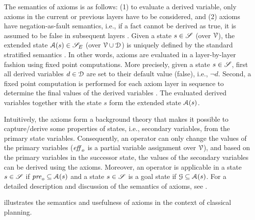 The semantics of axioms is as follows: (1) to evaluate a derived variable, only axioms in the current or previous layers have to be considered, and (2) axioms have negation-as-fault semantics, i.e., if a fact cannot be derived as true, it is assumed to be false in subsequent layers \autocite{speck-et-al-icaps2019}.
Given a state $s \in \mathscr S$ (over $\mathcal V$), the extended state $\mathcal A(s) \in \mathscr S_{E}$ (over $\mathcal V \cup \mathcal D$) is uniquely defined by the standard stratified semantics \autocite{apt-et-al-1988,thiebaux-et-al-aij2005}.
%
In other words, axioms are evaluated in a layer-by-layer fashion using fixed point computations.
More precisely, given a state $s \in \mathscr S$, first all derived variables $d \in \mathcal D$ are set to their default value (false), i.e., $\lnot d$. 
Second, a fixed point computation is performed for each axiom layer in sequence to determine the final values of the derived variables \autocite{helmert-2008}.
The evaluated derived variables together with the state $s$ form the extended state $\mathcal A(s)$.

Intuitively, the axioms form a background theory that makes it possible to capture/derive some properties of states, i.e., secondary variables, from the primary state variables.
Consequently, an operator can only change the values of the primary variables ($\mathit{eff}_o$ is a partial variable assignment over $\mathcal V$), and based on the primary variables in the successor state, the values of the secondary variables can be derived using the axioms.
Moreover, an operator is applicable in a state $s \in \mathscr S$ if $\mathit{pre}_o \subseteq \mathcal A(s)$ and a state $s \in \mathscr S$ is a goal state if $\mathcal G \subseteq \mathcal A(s)$.
For a detailed description and discussion of the semantics of axioms, see \textcite{thiebaux-et-al-aij2005,helmert-2008,helmert-jair2006}.


 illustrates the semantics and usefulness of axioms in the context of classical planning.

